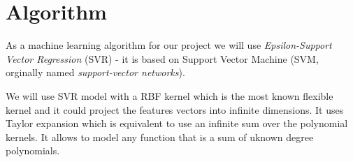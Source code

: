 \section{Algorithm}

As a machine learning algorithm for our project we will use \textit{Epsilon-Support Vector Regression}\cite{svrc} (SVR) - it is based on Support Vector Machine (SVM, orginally named \textit{support-vector networks}\cite{svm}).

We will use SVR model with a RBF kernel\cite{rbf_kernel} which is the most known flexible kernel and it could project the features vectors into infinite dimensions. It uses Taylor expansion which is equivalent to use an infinite sum over the polynomial kernels. It allows to model any function that is a sum of uknown degree polynomials.
